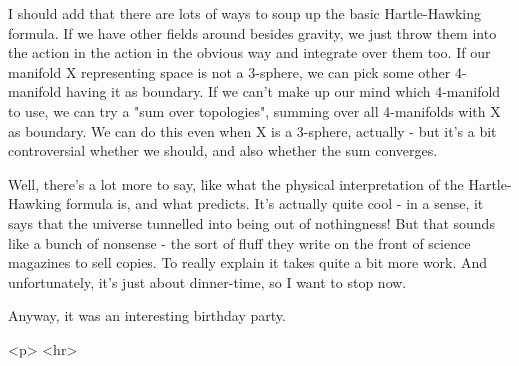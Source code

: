 I should add that there are lots of ways to soup up the basic
Hartle-Hawking formula.  If we have other fields around besides
gravity, we just throw them into the action in the action in the
obvious way and integrate over them too.  If our manifold X representing
space is not a 3-sphere, we can pick some other 4-manifold having it
as boundary.  If we can't make up our mind which 4-manifold to use, 
we can try a "sum over topologies", summing over all 4-manifolds
with X as boundary.  We can do this even when X is a 3-sphere, 
actually - but it's a bit controversial whether we should, and 
also whether the sum converges.  

Well, there's a lot more to say, like what the physical interpretation
of the Hartle-Hawking formula is, and what predicts.  It's actually quite 
cool - in a sense, it says that the universe tunnelled into being out of 
nothingness!  But that sounds like a bunch of nonsense - the sort of fluff 
they write on the front of science magazines to sell copies.  To really 
explain it takes quite a bit more work.  And unfortunately, it's just 
about dinner-time, so I want to stop now.  

Anyway, it was an interesting birthday party.  

<p> <hr>



